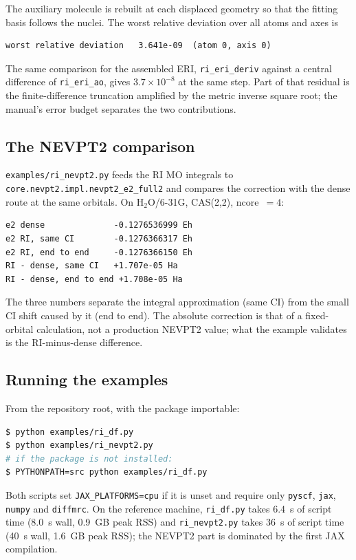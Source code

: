 The auxiliary molecule is rebuilt at each displaced geometry so that the
fitting basis follows the nuclei.  The worst relative deviation over all
atoms and axes is

\begin{lstlisting}
worst relative deviation   3.641e-09  (atom 0, axis 0)
\end{lstlisting}

The same comparison for the assembled ERI,
\texttt{ri\_eri\_deriv} against a central difference of
\texttt{ri\_eri\_ao}, gives $3.7\times10^{-8}$ at the same step.  Part
of that residual is the finite-difference truncation amplified by the
metric inverse square root; the manual's error budget separates the two
contributions.

\subsection{The NEVPT2 comparison}

\texttt{examples/ri\_nevpt2.py} feeds the RI MO integrals to
\texttt{core.nevpt2.impl.nevpt2\_e2\_full2} and compares the correction
with the dense route at the same orbitals.  On H$_2$O/6-31G,
CAS(2,2), ncore~$=4$:

\begin{lstlisting}
e2 dense              -0.1276536999 Eh
e2 RI, same CI        -0.1276366317 Eh
e2 RI, end to end     -0.1276366150 Eh
RI - dense, same CI   +1.707e-05 Ha
RI - dense, end to end +1.708e-05 Ha
\end{lstlisting}

The three numbers separate the integral approximation (same CI) from
the small CI shift caused by it (end to end).  The absolute correction
is that of a fixed-orbital calculation, not a production NEVPT2 value;
what the example validates is the RI-minus-dense difference.

\subsection{Running the examples}

From the repository root, with the package importable:

\begin{lstlisting}[language=bash]
$ python examples/ri_df.py
$ python examples/ri_nevpt2.py
# if the package is not installed:
$ PYTHONPATH=src python examples/ri_df.py
\end{lstlisting}

Both scripts set \texttt{JAX\_PLATFORMS=cpu} if it is unset and require
only \texttt{pyscf}, \texttt{jax}, \texttt{numpy} and \texttt{diffmrc}.
On the reference machine, \texttt{ri\_df.py} takes 6.4~s of script time
(8.0~s wall, 0.9~GB peak RSS) and \texttt{ri\_nevpt2.py} takes 36~s of
script time (40~s wall, 1.6~GB peak RSS); the NEVPT2 part is dominated
by the first JAX compilation.

